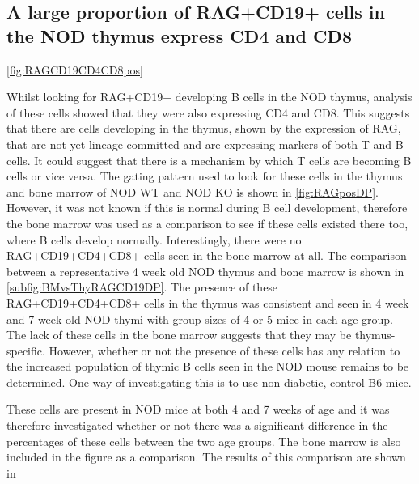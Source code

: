 \subsection{A large proportion of RAG+CD19+ cells in the NOD thymus express CD4 and CD8}

\cref{fig:RAGCD19CD4CD8pos}

Whilst looking for RAG+CD19+ developing B cells in the NOD thymus, analysis of these cells showed that they were also expressing CD4 and CD8. 
This suggests that there are cells developing in the thymus, shown by the expression of RAG, that are not yet lineage committed and are expressing markers of both T and B cells.
It could suggest that there is a mechanism by which T cells are becoming B cells or vice versa.
The gating pattern used to look for these cells in the thymus and bone marrow of NOD WT and NOD KO is shown in \cref{fig:RAGposDP}.
However, it was not known if this is normal during B cell development, therefore the bone marrow was used as a comparison to see if these cells existed there too, where B cells develop normally.
Interestingly, there were no RAG+CD19+CD4+CD8+ cells seen in the bone marrow at all. 
The comparison between a representative 4 week old NOD thymus and bone marrow is shown in \cref{subfig:BMvsThyRAGCD19DP}.
The presence of these RAG+CD19+CD4+CD8+ cells in the thymus was consistent and seen in 4 week and 7 week old NOD thymi with group sizes of 4 or 5 mice in each age group. 
The lack of these cells in the bone marrow suggests that they may be thymus-specific.
However, whether or not the presence of these cells has any relation to the increased population of thymic B cells seen in the NOD mouse remains to be determined.
One way of investigating this is to use non diabetic, control B6 mice.


These cells are present in NOD mice at both 4 and 7 weeks of age and it was therefore investigated whether or not there was a significant difference in the percentages of these cells between the two age groups. 
The bone marrow is also included in the figure as a comparison.
The results of this comparison are shown in 


